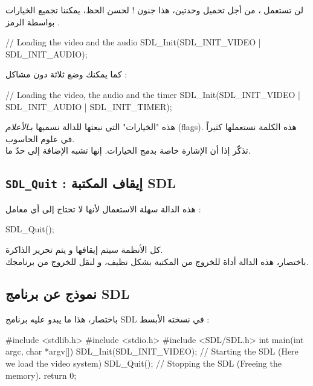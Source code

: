لن تستعمل
،
من أجل تحميل وحدتين، هذا جنون ! لحسن الحظ، يمكننا تجميع الخيارات بواسطة الرمز
\InlineCode{|}.

\begin{Csource}
// Loading the video and the audio
SDL_Init(SDL_INIT_VIDEO | SDL_INIT_AUDIO);
\end{Csource}

كما يمكنك وضع ثلاثة دون مشاكل :

\begin{Csource}
// Loading the video, the audio and the timer
SDL_Init(SDL_INIT_VIDEO | SDL_INIT_AUDIO | SDL_INIT_TIMER);
\end{Csource}

\begin{information}
هذه "الخيارات" التي نبعثها للدالة 
نسميها بـ\textit{الأعلام}
(\textenglish{flags}).
هذه الكلمة نستعملها كثيراً في علوم الحاسوب.\\
تذكّر إذا أن الإشارة
\InlineCode{|}
خاصة بدمج الخيارات. إنها تشبه الإضافة إلى حدّ ما.
\end{information}

\subsection{\texttt{SDL\_Quit} : إيقاف المكتبة \textenglish{SDL}}

هذه الدالة سهلة الاستعمال لأنها لا تحتاج إلى أي معامل :

\begin{Csource}
SDL_Quit();
\end{Csource}

كل الأنظمة سيتم إيقافها و يتم تحرير الذاكرة.\\
باختصار، هذه الدالة أداة للخروج من المكتبة بشكل نظيف، و لنقل للخروج من برنامجك.

\subsection{نموذج عن برنامج \textenglish{SDL}}
باختصار، هذا ما يبدو عليه برنامج
\textenglish{SDL}
في نسخته الأبسط :

\begin{Csource}
#include <stdlib.h>
#include <stdio.h>
#include <SDL/SDL.h>
int main(int argc, char *argv[])
{
	SDL_Init(SDL_INIT_VIDEO); // Starting the SDL (Here we load the video system)
	SDL_Quit(); // Stopping the SDL (Freeing the memory).
	return 0;
}
\end{Csource}

